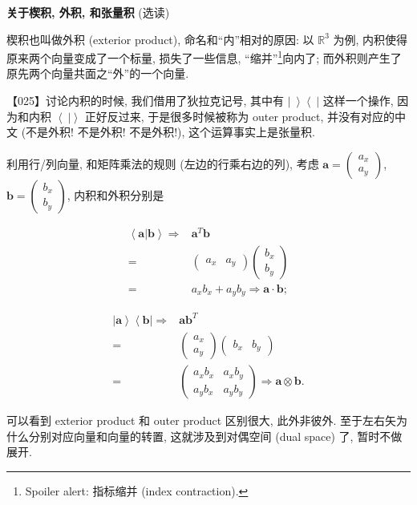 \begin{newquote}

\textbf{关于楔积, 外积, 和张量积} (选读)

楔积也叫做外积 (exterior product), 命名和``内''相对的原因: 以
\(\mathbb{R}^3\) 为例, 内积使得原来两个向量变成了一个标量,
损失了一些信息, ``缩并''\footnote{Spoiler alert: 指标缩并 (index
  contraction).}向内了;
而外积则产生了原先两个向量共面之``外''的一个向量.

【025】讨论内积的时候, 我们借用了狄拉克记号, 其中有
\(\left|\ \right>\left<\ \right|\) 这样一个操作, 因为和内积
\(\left<\ \right|\left.\right>\) 正好反过来, 于是很多时候被称为 outer
product, 并没有对应的中文 (不是外积! 不是外积! 不是外积!),
这个运算事实上是张量积.

利用行/列向量, 和矩阵乘法的规则 (左边的行乘右边的列), 考虑
$\boldsymbol{a}=\begin{pmatrix}a_x\\a_y\end{pmatrix}$,
$\boldsymbol{b}=\begin{pmatrix}b_x\\b_y\end{pmatrix}$, 内积和外积分别是

\begin{align*}
\left<{\boldsymbol{a}}\right|\left.\boldsymbol{b}\right>\Rightarrow&\boldsymbol{a}^T\boldsymbol{b}\\
=&\begin{pmatrix}a_x&a_y\end{pmatrix}\begin{pmatrix}b_x\\b_y\end{pmatrix}\\
=&a_xb_x+a_yb_y\Rightarrow\boldsymbol{a}\cdot\boldsymbol{b};
\end{align*}

\begin{align*}
\left|{\boldsymbol{a}}\right>\left<{\boldsymbol{b}}\right|\Rightarrow&\boldsymbol{a}\boldsymbol{b}^T\\
=&\begin{pmatrix}a_x\\a_y\end{pmatrix}\begin{pmatrix}b_x&b_y\end{pmatrix}\\
=&\begin{pmatrix}a_xb_x&a_xb_y\\a_yb_x&a_yb_y\end{pmatrix}\Rightarrow{\boldsymbol{a}}\otimes{\boldsymbol{b}}.
\end{align*}

可以看到 exterior product 和 outer product 区别很大, 此外非彼外.
至于左右矢为什么分别对应向量和向量的转置, 这就涉及到对偶空间 (dual
space) 了, 暂时不做展开.

\end{newquote}